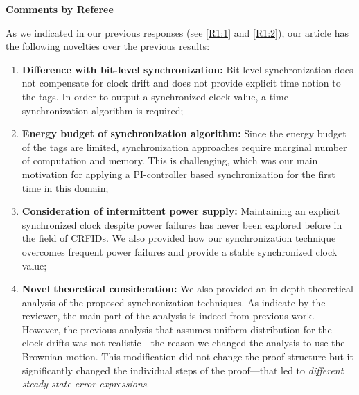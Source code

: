 \documentclass[10pt]{article}
\newcommand{\response}[1]{{\color{blue} #1}}
\newcounter{refereeCounter}
\newenvironment{responses}{%
\refstepcounter{refereeCounter}%
\textbf{\large Comments by Referee \therefereeCounter}
\begin{enumerate}%
\renewcommand{\labelenumi}{\textbf{[R\therefereeCounter :\,\arabic{enumi}]}} %
}{\end{enumerate}}
\begin{document}
\begin{responses}
\response{
As we indicated in our previous responses (see \hyperref[R1:1]{[R1:1]} and \hyperref[R1:2]{[R1:2]}), our article has the following novelties over the previous results:
\begin{enumerate}
	\item \textbf{Difference with bit-level synchronization:} Bit-level synchronization does not compensate for clock drift and does not provide explicit time notion to the tags. In order to output a synchronized clock value, a time synchronization algorithm is required;
	\item \textbf{Energy budget of synchronization algorithm:} Since the energy budget of the tags are limited, synchronization approaches require marginal number of computation and memory. This is challenging, which was our main motivation for applying a PI-controller based synchronization for the first time in this domain;
	\item \textbf{Consideration of intermittent power supply:} Maintaining an explicit synchronized clock despite power failures has never been explored before in the field of CRFIDs. We also provided how our synchronization technique overcomes frequent power failures and provide a stable synchronized clock value;
	\item \textbf{Novel theoretical consideration:} We also provided an in-depth theoretical analysis of the proposed synchronization techniques. As indicate by the reviewer, the main part of the analysis is indeed from previous work. However, the previous analysis that assumes uniform distribution for the clock drifts was not realistic---the reason we changed the analysis to use the Brownian motion. This modification did not change the proof structure but it significantly changed the individual steps of the proof---that led to \emph{different steady-state error expressions}.
\end{enumerate}
}

\end{responses}
\end{document}
